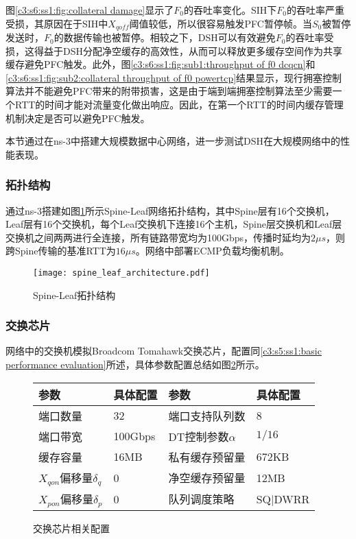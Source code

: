 图\ref{c3:s6:ss1:fig:collateral damage}显示了$F_0$的吞吐率变化。SIH下$F_0$的吞吐率严重受损，其原因在于SIH中$X_{qoff}$阈值较低，所以很容易触发PFC暂停帧。当$S_0$被暂停发送时，$F_0$的数据传输也被暂停。相较之下，DSH可以有效避免$F_0$的吞吐率受损，这得益于DSH分配净空缓存的高效性，从而可以释放更多缓存空间作为共享缓存避免PFC触发。此外，图\ref{c3:s6:ss1:fig:sub1:throughput of f0 dcqcn}和\ref{c3:s6:ss1:fig:sub2:collateral throughput of f0 powertcp}结果显示，现行拥塞控制算法并不能避免PFC带来的附带损害，这是由于端到端拥塞控制算法至少需要一个RTT的时间才能对流量变化做出响应。因此，在第一个RTT的时间内缓存管理机制决定是否可以避免PFC触发。


本节通过在ns-3中搭建大规模数据中心网络，进一步测试DSH在大规模网络中的性能表现。

\subsubsection{拓扑结构}

通过ns-3搭建如图\ref{fig:c3:spine leaf topology}所示Spine-Leaf网络拓扑结构，其中Spine层有16个交换机，Leaf层有16个交换机，每个Leaf交换机下连接16个主机，Spine层交换机和Leaf层交换机之间两两进行全连接，所有链路带宽均为100Gbps，传播时延均为$2 \mu s$，则跨Spine传输的基准RTT为$16 \mu s$。网络中部署ECMP负载均衡机制。

\begin{figure}[H]
  \centering
  \texttt{[image: spine\_leaf\_architecture.pdf]}
  \caption{Spine-Leaf拓扑结构}
  \label{fig:c3:spine leaf topology}
\end{figure}

\subsubsection{交换芯片}

网络中的交换机模拟Broadcom Tomahawk交换芯片，配置同\ref{c3:s5:ss1:basic performance evaluation}所述，具体参数配置总结如图\ref{fig:c3:parameter setting in switch chip}所示。

\begin{figure}[H]
  \begin{table}[H]
      \begin{tabularx}{\textwidth}{YYYY}
      \toprule
          \textbf{参数} & \textbf{具体配置} & \textbf{参数} & \textbf{具体配置} \\
      \midrule
          端口数量 & 32 & 端口支持队列数 & 8 \\
          端口带宽 & 100Gbps & DT控制参数$\alpha$ & $1/16$ \\
          缓存容量 & 16MB & 私有缓存预留量 & 672KB \\
          $X_{qon}$偏移量$\delta_q$ & 0 & 净空缓存预留量 & 12MB \\
          $X_{pon}$偏移量$\delta_p$ & 0 & 队列调度策略 & SQ|DWRR \\
      \bottomrule
      \end{tabularx}
  \end{table}
  \caption{交换芯片相关配置}
  \label{fig:c3:parameter setting in switch chip}
\end{figure}


